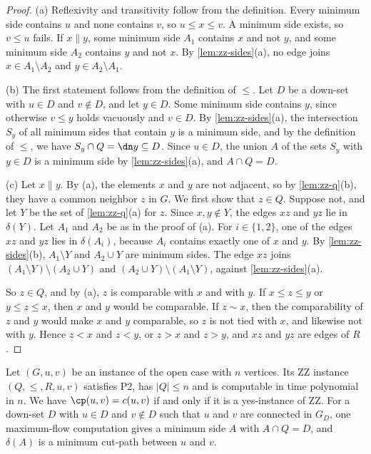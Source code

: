 \begin{proof}
(a) Reflexivity and transitivity follow from the definition.
Every minimum side contains $u$ and none contains $v$, so $u \leq x \leq v$.
A minimum side exists, so $v \leq u$ fails.
If $x \parallel y$, some minimum side $A_1$ contains $x$ and not $y$, and some minimum side $A_2$ contains $y$ and not $x$.
By \cref{lem:zz-sides}(a), no edge joins $x \in A_1 \setminus A_2$ and $y \in A_2 \setminus A_1$.

(b) The first statement follows from the definition of $\leq$.
Let $D$ be a down-set with $u \in D$ and $v \notin D$, and let $y \in D$.
Some minimum side contains $y$, since otherwise $v \leq y$ holds vacuously and $v \in D$.
By \cref{lem:zz-sides}(a), the intersection $S_y$ of all minimum sides that contain $y$ is a minimum side, and by the definition of $\leq$, we have $S_y \cap Q = \dn y \subseteq D$.
Since $u \in D$, the union $A$ of the sets $S_y$ with $y \in D$ is a minimum side by \cref{lem:zz-sides}(a), and $A \cap Q = D$.

(c) Let $x \parallel y$.
By (a), the elements $x$ and $y$ are not adjacent, so by \cref{lem:zz-q}(b), they have a common neighbor $z$ in $G$.
We first show that $z \in Q$.
Suppose not, and let $Y$ be the set of \cref{lem:zz-q}(a) for $z$.
Since $x, y \notin Y$, the edges $xz$ and $yz$ lie in $\delta(Y)$.
Let $A_1$ and $A_2$ be as in the proof of (a).
For $i \in \{1, 2\}$, one of the edges $xz$ and $yz$ lies in $\delta(A_i)$, because $A_i$ contains exactly one of $x$ and $y$.
By \cref{lem:zz-sides}(b), $A_1 \setminus Y$ and $A_2 \cup Y$ are minimum sides.
The edge $xz$ joins $(A_1 \setminus Y) \setminus (A_2 \cup Y)$ and $(A_2 \cup Y) \setminus (A_1 \setminus Y)$, against \cref{lem:zz-sides}(a).

So $z \in Q$, and by (a), $z$ is comparable with $x$ and with $y$.
If $x \leq z \leq y$ or $y \leq z \leq x$, then $x$ and $y$ would be comparable.
If $z \sim x$, then the comparability of $z$ and $y$ would make $x$ and $y$ comparable, so $z$ is not tied with $x$, and likewise not with $y$.
Hence $z < x$ and $z < y$, or $z > x$ and $z > y$, and $xz$ and $yz$ are edges of $R$.
\end{proof}

\begin{theorem}[Reduction]
\label{thm:zz-reduction}
Let $(G, u, v)$ be an instance of the open case with $n$ vertices.
Its ZZ instance $(Q, \leq, R, u, v)$ satisfies P2, has $|Q| \leq n$ and is computable in time polynomial in $n$.
We have $\cp(u, v) = c(u, v)$ if and only if it is a yes-instance of ZZ.
For a down-set $D$ with $u \in D$ and $v \notin D$ such that $u$ and $v$ are connected in $G_D$, one maximum-flow computation gives a minimum side $A$ with $A \cap Q = D$, and $\delta(A)$ is a minimum cut-path between $u$ and $v$.
\end{theorem}

